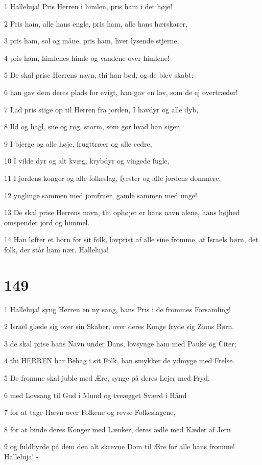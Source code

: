 \par 1 Halleluja! Pris Herren i himlen, pris ham i det høje!
\par 2 Pris ham, alle hans engle, pris ham, alle hans hærskarer,
\par 3 pris ham, sol og måne, pris ham, hver lysende stjerne,
\par 4 pris ham, himlenes himle og vandene over himlene!
\par 5 De skal prise Herrens navn, thi han bød, og de blev skabt;
\par 6 han gav dem deres plads for evigt, han gav en lov, som de ej overtræder!
\par 7 Lad pris stige op til Herren fra jorden, I havdyr og alle dyb,
\par 8 Ild og hagl, sne og røg, storm, som gør hvad han siger,
\par 9 I bjerge og alle høje, frugttræer og alle cedre,
\par 10 I vilde dyr og alt kvæg, krybdyr og vingede fugle,
\par 11 I jordens konger og alle folkeslag, fyrster og alle jordens dommere,
\par 12 ynglinge sammen med jomfruer, gamle sammen med unge!
\par 13 De skal prise Herrens navn, thi ophøjet er hans navn alene, hans højhed omspender jord og himmel.
\par 14 Han løfter et horn for sit folk, lovprist af alle sine fromme, af Israels børn, det folk, der står ham nær. Halleluja!

\chapter{149}

\par 1 Halleluja! syng Herren en ny sang, hans Pris i de frommes Forsamling!
\par 2 Israel glæde sig over sin Skaber, over deres Konge fryde sig Zions Børn,
\par 3 de skal prise hans Navn under Dans, lovsynge ham med Pauke og Citer;
\par 4 thi HERREN har Behag i sit Folk, han smykker de ydmyge med Frelse.
\par 5 De fromme skal juble med Ære, synge på deres Lejer med Fryd,
\par 6 med Lovsang til Gud i Mund og tveægget Sværd i Hånd
\par 7 for at tage Hævn over Folkene og revse Folkeslagene,
\par 8 for at binde deres Konger med Lænker, deres ædle med Kæder af Jern
\par 9 og fuldbyrde på dem den alt skrevne Dom til Ære for alle hans fromme! Halleluja! -

